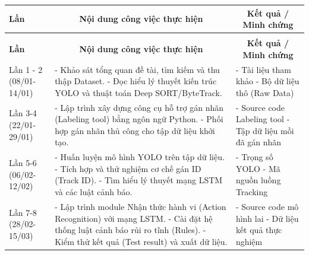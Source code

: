 \documentclass[12pt,a4paper]{report}
\begin{document}
\begin{center}
	\renewcommand{\arraystretch}{1.5} 
	\begin{longtable}{|>{\centering\arraybackslash}p{2.5cm}|p{6.5cm}|p{5cm}|}
		\hline
		\textbf{Lần} & \multicolumn{1}{c|}{\textbf{Nội dung công việc thực hiện}} & \multicolumn{1}{c|}{\textbf{Kết quả / Minh chứng}} \\
		\hline
		\endfirsthead
		
		\multicolumn{3}{c}{\textit{(Tiếp tục từ trang trước)}} \\
		\hline
		\textbf{Lần} & \multicolumn{1}{c|}{\textbf{Nội dung công việc thực hiện}} & \multicolumn{1}{c|}{\textbf{Kết quả / Minh chứng}} \\
		\hline
		\endhead
		
		\hline
		\endfoot
		\endlastfoot
		
		Lần 1 - 2 \newline (08/01-14/01)  & 
		- Khảo sát tổng quan đề tài, tìm kiếm và thu thập Dataset. \newline
		- Đọc hiểu lý thuyết kiến trúc YOLO và thuật toán Deep SORT/ByteTrack. & 
		- Tài liệu tham khảo \newline
		- Bộ dữ liệu thô (Raw Data) \\
		\hline
		
		Lần 3-4 \newline (22/01-29/01)  & 
		- Lập trình xây dựng công cụ hỗ trợ gán nhãn (Labeling tool) bằng ngôn ngữ Python. \newline
		- Phối hợp gán nhãn thủ công cho tập dữ liệu khởi tạo. & 
		- Source code Labeling tool \newline
		- Tập dữ liệu mồi đã gán nhãn \\
		\hline
		
		Lần 5-6 \newline (06/02-12/02)  & 
		- Huấn luyện mô hình YOLO trên tập dữ liệu. \newline
		- Tích hợp và thử nghiệm cơ chế gán ID (Track ID). \newline
		- Tìm hiểu lý thuyết mạng LSTM và các luật cảnh báo. & 
		- Trọng số YOLO \newline
		- Mã nguồn luồng Tracking \\
		\hline
		
		Lần 7-8 \newline (28/02-15/03)  & 
		- Lập trình module Nhận thức hành vi (Action Recognition) với mạng LSTM. \newline
		- Cài đặt hệ thống luật cảnh báo rủi ro tĩnh (Rules). \newline
		- Kiểm thử kết quả (Test result) và xuất dữ liệu. & 
		- Source code mô hình lai \newline
		- Dữ liệu kết quả thực nghiệm \\
		\hline
		

\end{longtable}
\end{center}
\end{document}
